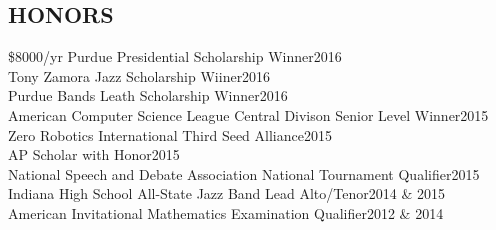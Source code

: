 \documentclass[line,margin]{res}
\begin{document}
\begin{resume}





  \section{HONORS}
  \$8000/yr Purdue Presidential Scholarship Winner\hfill 2016\\
  Tony Zamora Jazz Scholarship Wiiner\hfill 2016\\
  Purdue Bands Leath Scholarship Winner\hfill 2016\\
  American Computer Science League Central Divison Senior Level Winner\hfill 2015\\
  Zero Robotics International Third Seed Alliance\hfill 2015\\
  AP Scholar with Honor\hfill 2015\\
  National Speech and Debate Association National Tournament Qualifier\hfill 2015\\
  Indiana High School All-State Jazz Band Lead Alto/Tenor\hfill 2014 \& 2015\\
  American Invitational Mathematics Examination Qualifier\hfill 2012 \& 2014

\end{resume}
\end{document}

